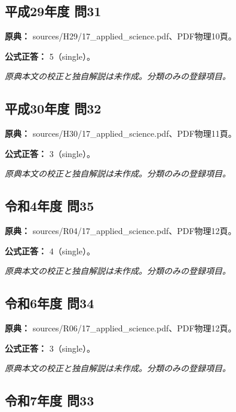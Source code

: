 \subsection{平成29年度 問31}
\label{q:h29-reg-applied-31}

\noindent\textbf{原典：} sources/H29/17\_applied\_science.pdf、PDF物理10頁。

\textbf{公式正答：} 5（single）。

\par\textit{原典本文の校正と独自解説は未作成。分類のみの登録項目。}

\subsection{平成30年度 問32}
\label{q:h30-reg-applied-32}

\noindent\textbf{原典：} sources/H30/17\_applied\_science.pdf、PDF物理11頁。

\textbf{公式正答：} 3（single）。

\par\textit{原典本文の校正と独自解説は未作成。分類のみの登録項目。}

\subsection{令和4年度 問35}
\label{q:r04-reg-applied-35}

\noindent\textbf{原典：} sources/R04/17\_applied\_science.pdf、PDF物理12頁。

\textbf{公式正答：} 4（single）。

\par\textit{原典本文の校正と独自解説は未作成。分類のみの登録項目。}

\subsection{令和6年度 問34}
\label{q:r06-reg-applied-34}

\noindent\textbf{原典：} sources/R06/17\_applied\_science.pdf、PDF物理12頁。

\textbf{公式正答：} 3（single）。

\par\textit{原典本文の校正と独自解説は未作成。分類のみの登録項目。}

\subsection{令和7年度 問33}
\label{q:r07-reg-applied-33}

